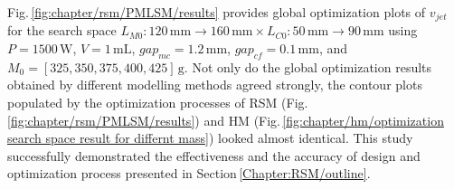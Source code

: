             
            Fig.\,\ref{fig:chapter/rsm/PMLSM/results} provides global optimization plots of $v_{jet}$ for the search space $L_{M0}:120\,\mathrm{mm}\rightarrow 160\,\mathrm{mm} \times L_{C0}:50\,\mathrm{mm}\rightarrow 90\,\mathrm{mm}$ using $P=1500\,\mathrm{W}$, $V=1\,\mathrm{mL}$, $gap_{mc}=1.2\,\mathrm{mm}$, $gap_{cf}=0.1\,\mathrm{mm}$,  and $M_0=[325,350,375,400,425]\,\mathrm{g}$. Not only do the global optimization results obtained by different modelling methods agreed strongly, the contour plots populated by the optimization processes of \acs{RSM} (Fig.\,\ref{fig:chapter/rsm/PMLSM/results}) and \acs{HM} (Fig.\,\ref{fig:chapter/hm/optimization search space result for differnt mass}) looked almost identical. This study successfully demonstrated the effectiveness and the accuracy of design and optimization process presented in Section\,\ref{Chapter:RSM/outline}.
        

